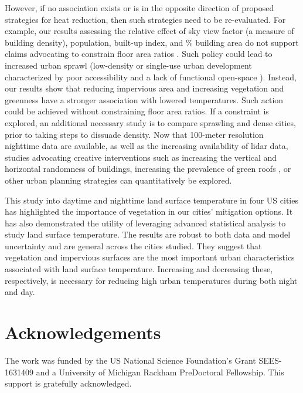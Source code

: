 \documentclass[final,3p,times,onecolumn,sort&compress]{elsarticle}
\begin{document}
However, if no association exists or is in the opposite direction of proposed strategies for heat reduction, then such strategies need to be re-evaluated.
For example, our results assessing the relative effect of sky view factor (a measure of building density), population, built-up index, and \% building area do not support claims advocating to constrain floor area ratios \citep{Chun2017-mm}.
Such policy could lead to increased urban sprawl (low-density or single-use urban development characterized by poor accessibility and a lack of functional open-space \citep{Ewing2015-xj}).
Instead, our results show that reducing impervious area and increasing vegetation and greenness have a stronger association with lowered temperatures.
Such action could be achieved without constraining floor area ratios.
If a constraint is explored, an additional necessary study is to compare sprawling and dense cities, prior to taking steps to dissuade density. 
Now that 100-meter resolution nighttime data are available, as well as the increasing availability of lidar data, studies advocating creative interventions such as increasing the vertical and horizontal randomness of buildings, increasing the prevalence of green roofs \citep{Gago2013-ta, Kelbaugh2019-th}, or other urban planning strategies can quantitatively be explored.

This study into daytime and nighttime land surface temperature in four US cities has highlighted the importance of vegetation in our cities' mitigation options. 
It has also demonstrated the utility of leveraging advanced statistical analysis to study land surface temperature.
The results are robust to both data and model uncertainty and are general across the cities studied.
They suggest that vegetation and impervious surfaces are the most important urban characteristics associated with land surface temperature.
Increasing and decreasing these, respectively, is necessary for reducing high urban temperatures during both night and day.


\section*{Acknowledgements}
The work was funded by the US National Science Foundation's Grant SEES-1631409 and a University of Michigan Rackham PreDoctoral Fellowship. 
This support is gratefully acknowledged.
\end{document}
